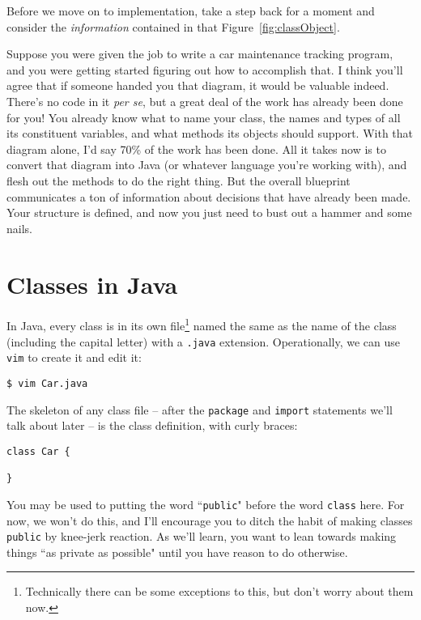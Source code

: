 Before we move on to implementation, take a step back for a moment and
consider the \textit{information} contained in that
Figure~\ref{fig:classObject}.

Suppose you were given the job to write a car maintenance tracking program,
and you were getting started figuring out how to accomplish that. I think
you'll agree that if someone handed you that diagram, it would be valuable
indeed. There's no code in it \textit{per se}, but a great deal of the work
has already been done for you! You already know what to name your class, the
names and types of all its constituent variables, and what methods its objects
should support. With that diagram alone, I'd say 70\% of the work has been
done. All it takes now is to convert that diagram into Java (or whatever
language you're working with), and flesh out the methods to do the right
thing. But the overall blueprint communicates a ton of information about
decisions that have already been made. Your structure is defined, and now you
just need to bust out a hammer and some nails.


\section{Classes in Java}

In Java, every class is in its own file\footnote{Technically there can be
some exceptions to this, but don't worry about them now.} named the same as
the name of the class (including the capital letter) with a \texttt{.java}
extension. Operationally, we can use \texttt{vim} to create it and edit it:

\begin{verbatim}
$ vim Car.java
\end{verbatim}

The skeleton of any class file -- after the \texttt{package} and
\texttt{import} statements we'll talk about later -- is the class definition,
with curly braces:

\begin{Verbatim}[samepage=true,fontsize=\footnotesize,frame=single]
class Car {
    
}
\end{Verbatim}

You may be used to putting the word ``\texttt{public}" before the word
\texttt{class} here. For now, we won't do this, and I'll encourage you to
ditch the habit of making classes \texttt{public} by knee-jerk reaction. As
we'll learn, you want to lean towards making things ``as private as possible"
until you have reason to do otherwise.


